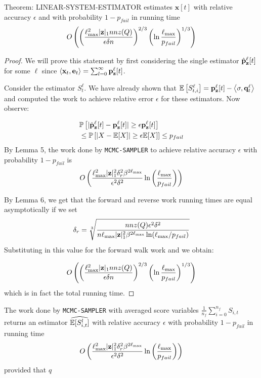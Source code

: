 \begin{theorem}
\label{thm:main}
Theorem: LINEAR-SYSTEM-ESTIMATOR estimates $\mathbf{x}[t]$ with relative accuracy $\epsilon$ and with probability $1-p_{fail}$ in running time 
$$ O\left( \left(\frac{\ell_{\max}^2 |\mathbf{z}|_1 nnz(Q)}{\epsilon \delta n} \right)^{2/3} \left(\ln \frac{\ell_{\max}}{p_{fail}} \right)^{1/3} \right)$$

\end{theorem}
\begin{proof}
We will prove this statement by first considering the single estimator $\hat{\mathbf{p}}_\mathbf{z}^{\ell}[t]$ for some $\ell$ since $\left< \mathbf{x}_t, \mathbf{e}_t \right> = \sum_{l=0}^{\infty} {\mathbf{p}}_\mathbf{z}^{\ell}[t]$.

Consider the estimator $S_{t}^{\ell}$. We have already shown that ${\mathbb{E}}\left[S_{t, i}^{\ell}\right] = {\mathbf{p}}_\mathbf{z}^{\ell}[t] - \left< \sigma, \mathbf{q}^{\ell}_t \right>$ and computed the work to achieve relative error $\epsilon$ for these estimators. Now observe:

\begin{align*}
&\mathbb{P}\left[ | \hat{\mathbf{p}}_\mathbf{z}^{\ell}[t] - {\mathbf{p}}_\mathbf{z}^{\ell}[t]| \geq  \epsilon {\mathbf{p}}_\mathbf{z}^{\ell}[t] \right] \\
&\leq \mathbb{P}\left[ |X -\mathbb{E}[X]| \geq \epsilon \mathbb{E}[X]\right] \leq p_{fail}
\end{align*}
By Lemma 5, the work done by \texttt{MCMC-SAMPLER} to achieve relative accuracy $\epsilon$ with probability $1-p_{fail}$ is 
$$ {O}\left( \frac{\ell_{\max}^2 |\mathbf{z}|_1^2 \delta_r^2 \beta^{2\ell_{\max}}}{\epsilon^2\delta^2}\ln \left(\frac{\ell_{\max}}{p_{fail}}\right)\right) $$

By Lemma 6, we get that the forward and reverse work running times are equal asymptotically if we set 
$$\delta_r = \sqrt[3]{\frac{nnz(Q) \epsilon^2\delta^2}{n\ell_{\max} |\mathbf{z}|_1^2\beta^{2\ell_{\max}}\ln(\ell_{\max}/p_{fail}) } }$$
Substituting in this value for the forward walk work and we obtain:

$$ O\left( \left(\frac{\ell_{\max}^2 |\mathbf{z}|_1 nnz(Q)}{\epsilon \delta n} \right)^{2/3} \left(\ln \frac{\ell_{\max}}{p_{fail}} \right)^{1/3} \right)$$
which is in fact the total running time.
\end{proof}

\begin{lemma}
The work done by \texttt{MCMC-SAMPLER} with averaged score variables $\frac{1}{n_f}\sum_{i=0}^{n_f} S_{i, t}$ returns an estimator $\widehat{{\mathbb{E}}[S_{i, t}^l]}$ with relative accuracy $\epsilon$ with probability $1-p_{fail}$ in running time
$${O}\left( \frac{\ell_{\max}^2 |\mathbf{z}|_1^2 \delta_r^2 \beta^{2\ell_{\max}}}{\epsilon^2\delta^2}\ln \left(\frac{\ell_{\max}}{p_{fail}}\right)\right)$$
provided that $q$
\end{lemma}

